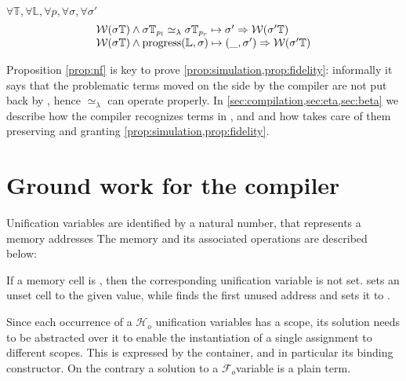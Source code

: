 \documentclass[sigconf,natbib=false,review]{acmart}
\newcommand{\UnifRel}{\ensuremath{\simeq}}
\newcommand{\Ue}{\ensuremath{\UnifRel_\lambda}\xspace}
\newcommand{\Fo}{\ensuremath{\mathcal{F}_{\!o}\xspace}} %
\newcommand{\Ho}{\ensuremath{\mathcal{H}_o}\xspace}
\newcommand{\linkStore}{\ensuremath{\mathbb{L}}\xspace}
\newcommand{\hoUnifPb}{\ensuremath{\mathbb{T}}\xspace}
\begin{document}
\noindent

\begin{proposition}\label{prop:nf}
$\forall \hoUnifPb, \forall \linkStore, \forall p, \forall \sigma, \forall \sigma'$
$$
\begin{array}{l}
\wellb(\sigma\hoUnifPb) \land
  \sigma\hoUnifPb_{p_l} \Ue \sigma\hoUnifPb_{p_r} \mapsto {\sigma'}
  \Rightarrow \wellb(\sigma' \hoUnifPb)\\
\wellb(\sigma\hoUnifPb) \land
  \progress(\linkStore,\sigma) \mapsto (\_,\sigma')
  \Rightarrow \wellb(\sigma' \hoUnifPb)
\end{array}
$$
\end{proposition}

\noindent
Proposition \ref{prop:nf} is key to prove \cref{prop:simulation,prop:fidelity}:
informally it says that the problematic terms moved on the side by the compiler
are not put back by \hstep, hence \Ue{} can operate properly.
In \cref{sec:compilation,sec:eta,sec:beta}
we describe how the compiler recognizes terms in \maybebeta, \maybeeta and
\notllambda and how \progress takes care of them preserving \wellb
and granting \cref{prop:simulation,prop:fidelity}.


\section{Ground work for the compiler}
\label{sec:grounwork}


% 

Unification variables are identified by a
natural number, that represents a memory addresses
The memory and its associated operations are described below:



\noindent
If a memory cell is , then the corresponding unification variable
is not set.  sets an unset cell to the given value, while
 finds the first unused address and sets it to .

Since each occurrence of a \Ho unification variables has a scope,
its solution needs to be abstracted over it to enable the
instantiation of a single assignment to different scopes.
This is expressed by the  container, and in particular
its  binding constructor.
On the contrary a solution to a \Fo variable is a plain term.
\end{document}
